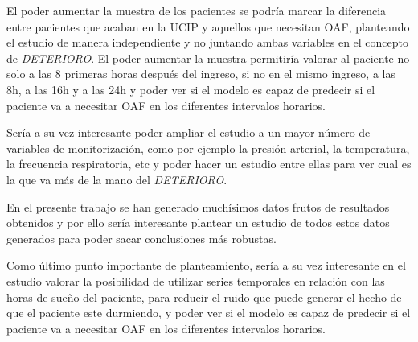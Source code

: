 El poder aumentar la muestra de los pacientes se podría marcar la diferencia entre pacientes que acaban en la UCIP y aquellos que necesitan OAF, planteando el estudio de manera independiente y no juntando ambas variables en el concepto de \textit{DETERIORO}. El poder aumentar la muestra permitiría valorar al paciente no solo a las 8 primeras horas después del ingreso, si no en el mismo ingreso, a las 8h, a las 16h y a las 24h y poder ver si el modelo es capaz de predecir si el paciente va a necesitar OAF en los diferentes intervalos horarios.

Sería a su vez interesante poder ampliar el estudio a un mayor número de variables de monitorización, como por ejemplo la presión arterial, la temperatura, la frecuencia respiratoria, etc y poder hacer un estudio entre ellas para ver cual es la que va más de la mano del \textit{DETERIORO}.

En el presente trabajo se han generado muchísimos datos frutos de resultados obtenidos y por ello sería interesante plantear un estudio de todos estos datos generados para poder sacar conclusiones más robustas. 

Como último punto importante de planteamiento, sería a su vez interesante en el estudio valorar la posibilidad de utilizar series temporales en relación con las horas de sueño del paciente, para reducir el ruido que puede generar el hecho de que el paciente este durmiendo, y poder ver si el modelo es capaz de predecir si el paciente va a necesitar OAF en los diferentes intervalos horarios. 
